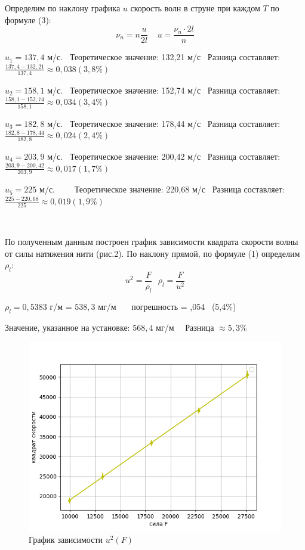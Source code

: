 \documentclass{article}
\begin{document}
\newpage
Определим по наклону графика $u$ скорость волн в струне при каждом $T$ по формуле (3): $$\nu_n = n\frac{u}{2l} \ \ \ \ \ u=\frac{\nu_n \cdot2l}{n}$$

$u_1 = 137,4$ м/с.  \ Теоретическое значение: 132,21 м/с \ Разница составляет: $\frac{137,4-132,21}{137,4} \approx 0,038 (3,8\%)$

$u_2 = 158,1$ м/с.  \ Теоретическое значение: 152,74 м/с \ Разница составляет: $\frac{158,1-152,74}{158,1} \approx 0,034 (3,4\%)$

$u_3 = 182,8$ м/с.  \ Теоретическое значение: 178,44 м/с \ Разница составляет: $\frac{182,8-178,44}{182,8} \approx 0,024 (2,4\%)$

$u_4 = 203,9$ м/с.  \ Теоретическое значение: 200,42 м/с \ Разница составляет: $\frac{203,9-200,42}{203,9} \approx 0,017 (1,7\%)$

$u_5 = 225$ м/с. \ \ \ \ Теоретическое значение: 220,68 м/с \  Разница составляет: $\frac{225-220,68}{225} \approx0,019 (1,9\%)$

\

По полученным данным построен график зависимости квадрата скорости волны от силы натяжения нити (рис.2). По наклону прямой, по формуле (1) определим $\rho_l$: $$u^2 = \frac{F}{\rho_l} \ \ \ \rho_l = \frac{F}{u^2}$$

$\rho_l = 0,5383$ г/м = $538,3$ мг/м \ \ \ погрешность =  ,054 \ (5,4\%)

Значение, указанное на установке: $568,4$ мг/м \ \ Разница $\approx 5,3\%$

\begin{figure}[h]
    \centering
    \includegraphics[width=1\linewidth]{2.png}
    \caption{График зависимости $u^2(F)$}
\end{figure}
\end{document}
